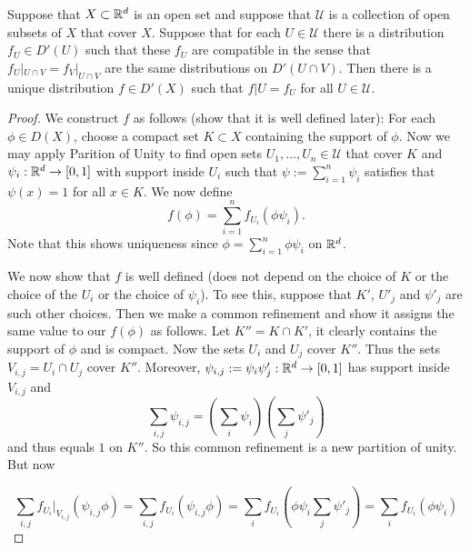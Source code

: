 \documentclass[twoside, a4paper, 10pt]{amsart}
\begin{document}
\begin{thm} Suppose that $X \subset \mathbb{R}^d$ is an open set and suppose that $\mathcal{U}$ is a collection of open subsets of $X$ that cover $X$. Suppose that for each $U \in \mathcal{U}$ there is a distribution $f_U \in D'(U)$ such that these $f_U$ are compatible in the sense that $f_U|_{U \cap V} = f_V|_{U \cap V}$ are the same distributions on $D'(U \cap V)$. Then there is a unique distribution $f \in D'(X)$ such that $f|U = f_U$ for all $U \in \mathcal{U}$.

\end{thm}

\begin{proof} We construct $f$ as follows (show that it is well defined later): For each $\phi \in D(X)$, choose a compact set $K \subset X$ containing the support of $\phi$. Now we may apply Parition of Unity to find open sets $U_1, \ldots, U_n \in \mathcal{U}$ that cover $K$ and $\psi_i:\mathbb{R}^d \to [0,1]$ with support inside $U_i$ such that $\psi := \sum_{i=1}^n \psi_i$ satisfies that $\psi(x) = 1$ for all $x \in K$. We now define $$f(\phi) = \sum_{i=1}^n f_{U_i}(\phi \psi_i).$$ Note that this shows uniqueness since $\phi = \sum_{i=1}^n \phi \psi_i$ on $\mathbb{R}^d$.

We now show that $f$ is well defined (does not depend on the choice of $K$ or the choice of the $U_i$ or the choice of $\psi_i$). To see this, suppose that $K'$, $U'_j$ and $\psi'_j$ are such other choices. Then we make a common refinement and show it assigns the same value to our $f(\phi)$ as follows. Let $K'' = K \cap K'$, it clearly contains the support of $\phi$ and is compact. Now the sets $U_i$ and $U_j$ cover $K''$. Thus the sets $V_{i,j} = U_i \cap U_j$ cover $K''$. Moreover, $\psi_{i,j}:=\psi_i \psi'_j:\mathbb{R}^d \to [0,1]$ has support inside $V_{i,j}$ and $$\sum_{i,j} \psi_{i,j} = \left(\sum_i \psi_i \right) \left( \sum_j \psi'_j \right)$$ and thus equals $1$ on $K''$. So this common refinement is a new partition of unity. But now 

$$\sum_{i,j} f_{U_i}|_{V_{i,j}}(\psi_{i,j}\phi) = \sum_{i,j} f_{U_i}(\psi_{i,j}\phi)  = \sum_i f_{U_i}(\phi\psi_{i}\sum_j \psi'_j) = \sum_i f_{U_i}(\phi \psi_i) $$ 


\end{proof}
\end{document}
